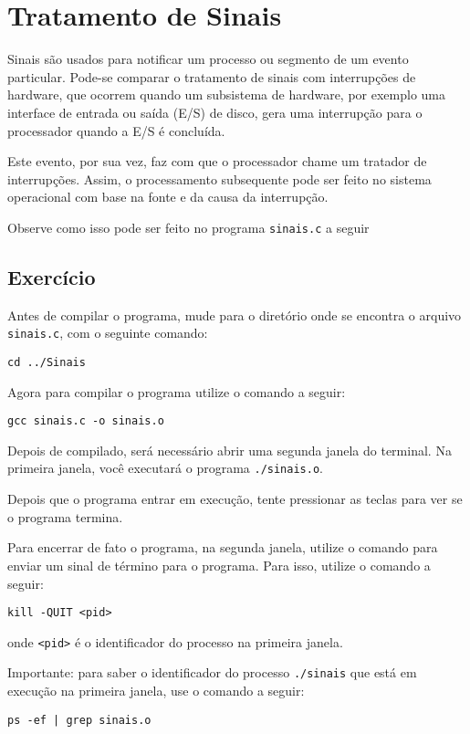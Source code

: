 \chapter{Tratamento de Sinais}

Sinais são usados para notificar um processo ou segmento de um evento particular. Pode-se comparar o tratamento de sinais com interrupções de hardware, que ocorrem quando um subsistema de hardware, por exemplo uma interface de entrada ou saída (E/S) de disco, gera uma interrupção para o processador quando a E/S é concluída.

Este evento, por sua vez, faz com que o processador chame um tratador de interrupções. Assim, o processamento subsequente pode ser feito no sistema operacional com base na fonte e da causa da interrupção.

Observe como isso pode ser feito no programa \texttt{sinais.c} a seguir



\section{Exercício}
 Antes de compilar o programa, mude para o diretório onde se encontra o arquivo \texttt{sinais.c}, com o seguinte comando:

\begin{lstlisting}[style=MyBashStyle]
cd ../Sinais
\end{lstlisting}

Agora para compilar o programa utilize o comando a seguir:
\begin{lstlisting}[style=MyBashStyle]
gcc sinais.c -o sinais.o 
\end{lstlisting}

Depois de compilado, será necessário abrir uma segunda janela do terminal. Na primeira janela, você executará o programa \texttt{./sinais.o}. 

Depois que o programa entrar em execução, tente pressionar as teclas  para ver se o programa termina.

Para encerrar de fato o programa, na segunda janela, utilize o comando  para enviar um sinal de término para o programa. Para isso, utilize o comando a seguir:

\begin{lstlisting}[style=MyBashStyle]
kill -QUIT <pid>
\end{lstlisting}

\noindent onde \texttt{<pid>} é o identificador do processo na primeira janela.

Importante: para saber o identificador do processo \texttt{./sinais} que está em execução na primeira janela, use o comando a seguir:

\begin{lstlisting}[style=MyBashStyle]
ps -ef | grep sinais.o
\end{lstlisting}
